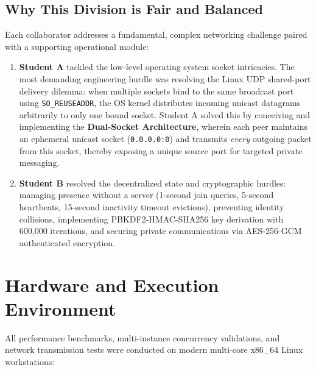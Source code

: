 \documentclass[11pt,a4paper]{article}
\begin{document}
\subsection{Why This Division is Fair and Balanced}
Each collaborator addresses a fundamental, complex networking challenge paired with a supporting operational module:
\begin{enumerate}[noitemsep]
    \item \textbf{Student A} tackled the low-level operating system socket intricacies. The most demanding engineering hurdle was resolving the Linux UDP shared-port delivery dilemma: when multiple sockets bind to the same broadcast port using \texttt{SO\_REUSEADDR}, the OS kernel distributes incoming unicast datagrams arbitrarily to only one bound socket. Student A solved this by conceiving and implementing the \textbf{Dual-Socket Architecture}, wherein each peer maintains an ephemeral unicast socket (\texttt{0.0.0.0:0}) and transmits \textit{every} outgoing packet from this socket, thereby exposing a unique source port for targeted private messaging.
    \item \textbf{Student B} resolved the decentralized state and cryptographic hurdles: managing presence without a server (1-second join queries, 5-second heartbeats, 15-second inactivity timeout evictions), preventing identity collisions, implementing PBKDF2-HMAC-SHA256 key derivation with 600,000 iterations, and securing private communications via AES-256-GCM authenticated encryption.
\end{enumerate}

\section{Hardware and Execution Environment}

All performance benchmarks, multi-instance concurrency validations, and network transmission tests were conducted on modern multi-core x86\_64 Linux workstations:
\end{document}
